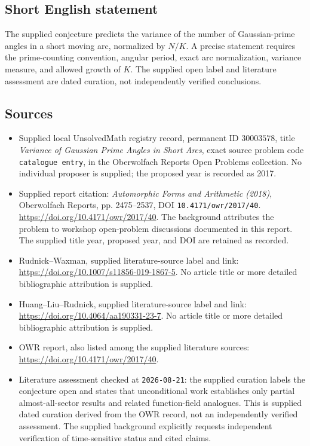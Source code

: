 \documentclass[11pt]{article}
\begin{document}
\subsection{Short English statement}
The supplied conjecture predicts the variance of the number of Gaussian-prime angles in a short moving arc, normalized by \(N/K\). A precise statement requires the prime-counting convention, angular period, exact arc normalization, variance measure, and allowed growth of \(K\). The supplied open label and literature assessment are dated curation, not independently verified conclusions.
\subsection{Sources}
\begin{itemize}
\item Supplied local UnsolvedMath registry record, permanent ID \(30003578\), title \emph{Variance of Gaussian Prime Angles in Short Arcs}, exact source problem code \texttt{catalogue entry}, in the Oberwolfach Reports Open Problems collection. No individual proposer is supplied; the proposed year is recorded as 2017.
\item Supplied report citation: \emph{Automorphic Forms and Arithmetic (2018)}, Oberwolfach Reports, pp. 2475--2537, DOI \texttt{10.4171/owr/2017/40}. \url{https://doi.org/10.4171/owr/2017/40}. The background attributes the problem to workshop open-problem discussions documented in this report. The supplied title year, proposed year, and DOI are retained as recorded.
\item Rudnick--Waxman, supplied literature-source label and link: \url{https://doi.org/10.1007/s11856-019-1867-5}. No article title or more detailed bibliographic attribution is supplied.
\item Huang--Liu--Rudnick, supplied literature-source label and link: \url{https://doi.org/10.4064/aa190331-23-7}. No article title or more detailed bibliographic attribution is supplied.
\item OWR report, also listed among the supplied literature sources: \url{https://doi.org/10.4171/owr/2017/40}.
\item Literature assessment checked at \texttt{2026-08-21}: the supplied curation labels the conjecture open and states that unconditional work establishes only partial almost-all-sector results and related function-field analogues. This is supplied dated curation derived from the OWR record, not an independently verified assessment. The supplied background explicitly requests independent verification of time-sensitive status and cited claims.
\end{itemize}
\end{document}
